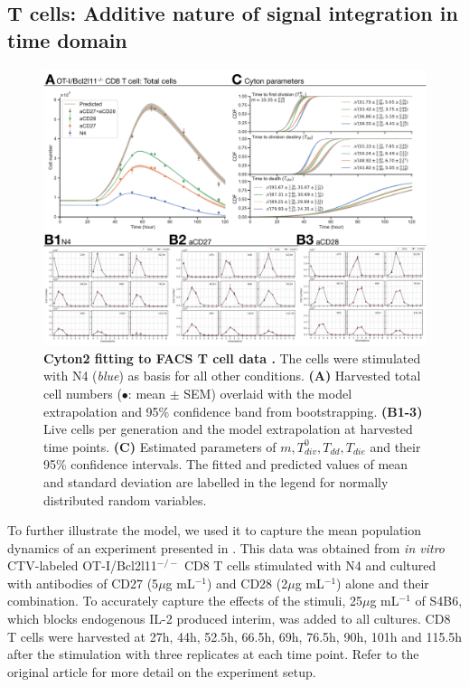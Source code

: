 \documentclass[11pt, a4paper]{article}
\begin{document}
\nolinenumbers
\subsection{T cells: Additive nature of signal integration in time domain}
\begin{figure}[t]
    \centering
    \includegraphics[scale=0.6]{figs/fig6.pdf}
    \caption{\textbf{Cyton2 fitting to FACS T cell data \parencite{Marchingo.2014}.} The cells were stimulated with N4 (\textit{blue}) as basis for all other conditions. \textbf{(A)} Harvested total cell numbers ($\bullet$: mean $\pm$ SEM) overlaid with the model extrapolation and 95\% confidence band from bootstrapping. \textbf{(B1-3)} Live cells per generation and the model extrapolation at harvested time points. \textbf{(C)} Estimated parameters of $m, T_{div}^0, T_{dd}, T_{die}$ and their 95\% confidence intervals. The fitted and predicted values of mean and standard deviation are labelled in the legend for normally distributed random variables.}
    \label{fig:application}
\end{figure}
To further illustrate the model, we used it to capture the mean population dynamics of an experiment presented in \cite{Marchingo.2014}. This data was obtained from \textit{in vitro} CTV-labeled OT-I/Bcl2l11$^{-/-}$ CD8 T cells stimulated with N4 and cultured with antibodies of CD27 (5$\mu$g mL$^{-1}$) and CD28 (2$\mu$g mL$^{-1}$) alone and their combination. To accurately capture the effects of the stimuli, 25$\mu$g mL$^{-1}$ of S4B6, which blocks endogenous IL-2 produced interim, was added to all cultures. CD8 T cells were harvested at 27h, 44h, 52.5h, 66.5h, 69h, 76.5h, 90h, 101h and 115.5h after the stimulation with three replicates at each time point. Refer to the original article for more detail on the experiment setup.
\end{document}
